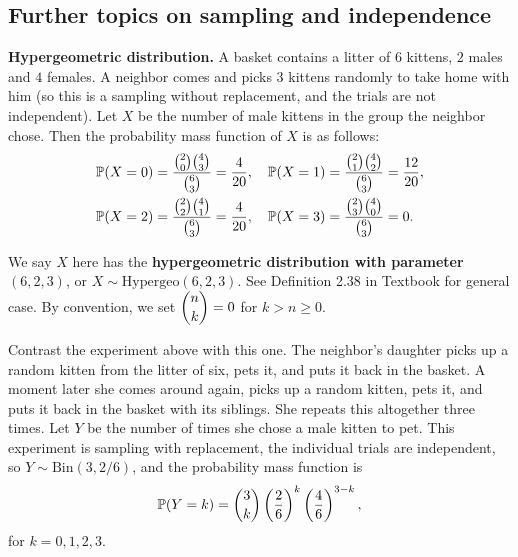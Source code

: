 \subsection{Further topics on sampling and independence}
\label{subsec:sampling-indep}
\textbf{Hypergeometric distribution.} A basket contains a litter of $6$ kittens,
$2$ males and $4$ females. A neighbor comes and picks $3$ kittens randomly to
take home with him (so this is a sampling without replacement, and the trials
are not independent). Let $X$ be the number of male kittens in the group the
neighbor chose. Then the probability mass function of $X$ is as follows:
\begin{align*}
  \mathbb{P}(X=0) & =\frac{\binom{2}{0}\binom{4}{3}}{\binom{6}{3}} = \frac{4}{20},\quad
  \mathbb{P}(X=1) =\frac{\binom{2}{1}\binom{4}{2}}{\binom{6}{3}} = \frac{12}{20},\\
  \mathbb{P}(X=2) & =\frac{\binom{2}{2}\binom{4}{1}}{\binom{6}{3}} = \frac{4}{20},\quad
  \mathbb{P}(X=3) =\frac{\binom{2}{3}\binom{4}{0}}{\binom{6}{3}} = 0.
\end{align*}
\begin{remark}
  We say $X$ here has the \textbf{hypergeometric distribution with parameter
    $(6,2,3)$}, or $X\sim\text{Hypergeo}(6,2,3)$. See Definition 2.38 in
  Textbook for general case. By convention, we set
  $\displaystyle\binom{n}{k} =0$ for $k>n\ge 0$.
\end{remark}

Contrast the experiment above with this one. The neighbor's daughter picks
up a random kitten from the litter of six, pets it, and puts it back in the basket.
A moment later she comes around again, picks up a random kitten, pets it, and
puts it back in the basket with its siblings. She repeats this altogether three
times. Let $Y$ be the number of times she chose a male kitten to pet. This
experiment is sampling with replacement, the individual trials are independent,
so $Y\sim\text{Bin}(3,2/6)$, and the probability mass function is
\[
  \mathbb{P}(Y = k) =\binom{3}{k}\left(\frac{2}{6}\right)^k\left(\frac{4}{6}\right)^{3-k},
\]
for $k = 0, 1,2,3$.

